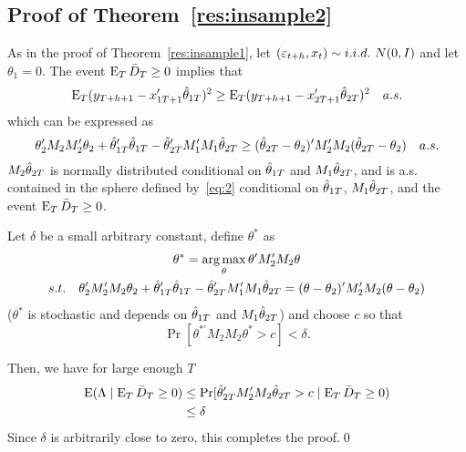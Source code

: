 


\subsection{Proof of Theorem~\ref{res:insample2}}
As in the proof of Theorem~\ref{res:insample1}, let $(\varepsilon_{t+h}, x_{t})
\sim i.i.d.\ N(0,I)$ and let $\theta_1 = 0$. The event $\operatorname{E}_T \bar{D}_{T}
\geq 0$ implies that
\begin{equation*}
  \operatorname{E}_T (y_{T+h+1} - x_{1T+1}'\hat\theta_{1T})^2
  \geq \operatorname{E}_T (y_{T+h+1} - x_{2T+1}'\hat\theta_{2T})^2 \quad a.s.
\end{equation*}
which can be expressed as
\begin{equation}\label{eq:2}
  \theta_2'M_2 M_2'\theta_2 + \hat\theta_{1T}'\hat\theta_{1T} - \hat\theta_{2T}'M_1'M_1\hat\theta_{2T}
  \geq (\hat\theta_{2T} - \theta_2)' M_2'M_2 (\hat\theta_{2T} - \theta_2) \quad a.s.
\end{equation}
$M_2 \hat\theta_{2T}$ is normally distributed conditional on $\hat\theta_{1T}$ and
$M_1 \hat\theta_{2T}$, and is a.s. contained in the sphere defined
by~\eqref{eq:2} conditional on $\hat\theta_{1T}$, $M_1 \hat\theta_{2T}$, and the
event $\operatorname{E}_T \bar{D}_{T} \geq 0$.

Let $\delta$ be a small arbitrary constant, define $\theta^*$ as
\begin{gather*}
  \theta^* = \operatorname*{arg\,max}_\theta \theta' M_2' M_2 \theta \\
  s.t.\quad \theta_2'M_2'M_2\theta_2 +  \hat\theta_{1T}'\hat\theta_{1T} - \hat\theta_{2T}'M_1'M_1\hat\theta_{2T} = (\theta - \theta_2)' M_2'M_2 (\theta - \theta_2)
\end{gather*}
($\theta^*$ is stochastic and depends on $\hat\theta_{1T}$ and $M_1 \hat\theta_{2T}$)
and choose $c$ so that
\begin{equation*}
  \Pr[ \theta^{* \prime} M_2 M_2 \theta^* > c] < \delta.
\end{equation*}

Then, we have for large enough $T$
\begin{align*}
  \operatorname{E}(\Lambda \mid \operatorname{E}_T \bar{D}_{T} \geq 0) &\leq
  \Pr[\hat\theta_{2T}'M_2'M_2\hat\theta_{2T} > c \mid \operatorname{E}_T \bar{D}_{T} \geq 0) \\
  &\leq \delta
\end{align*}
Since $\delta$ is arbitrarily close to zero, this completes the proof.\qed


